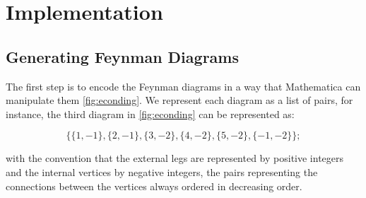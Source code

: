 \documentclass[main.tex]{subfiles}
\begin{document}
\section{Implementation}

\subsection{Generating Feynman Diagrams}

The first step is to encode the Feynman diagrams in a way that Mathematica can manipulate them \cref{fig:econding}.
We represent each diagram as a list of pairs, for instance, the third diagram in \cref{fig:econding} can be represented as:

\begin{equation*}
    \{\{1,-1\},\{2,-1\},\{3,-2\},\{4,-2\},\{5,-2\},\{-1,-2\}\};
\end{equation*}

with the convention that the external legs are represented by positive integers and the internal vertices by negative integers, the 
pairs representing the connections between the vertices always ordered in decreasing order.
\end{document}
